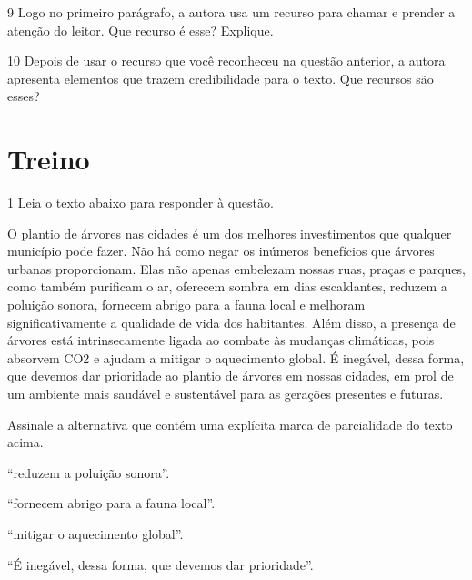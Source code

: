 \num{9} Logo no primeiro parágrafo, a autora usa um recurso para chamar e prender
a atenção do leitor. Que recurso é esse? Explique. 


\num{10} Depois de usar o recurso que você reconheceu na questão anterior, a 
autora apresenta elementos que trazem credibilidade para o texto. Que recursos
são esses? 


\section*{Treino}

\num{1} Leia o texto abaixo para responder à questão.

\begin{myquote}
O plantio de árvores nas cidades é um dos melhores investimentos que qualquer 
município pode fazer. Não há como negar os inúmeros benefícios que árvores urbanas 
proporcionam. Elas não apenas embelezam nossas ruas, praças e parques, como também purificam
o ar, oferecem sombra em dias escaldantes, reduzem a poluição sonora, fornecem
abrigo para a fauna local e melhoram significativamente a qualidade de vida
dos habitantes. Além disso, a presença de árvores está intrinsecamente ligada
ao combate às mudanças climáticas, pois absorvem CO2 e ajudam a mitigar o
aquecimento global. É inegável, dessa forma, que devemos dar prioridade ao plantio
de árvores em nossas cidades, em prol de um ambiente mais saudável e
sustentável para as gerações presentes e futuras.


\end{myquote}

Assinale a alternativa que contém uma explícita marca de parcialidade do texto acima.

\begin{escolha}

  \item ``reduzem a poluição sonora''.
  \item ``fornecem abrigo para a fauna local''.
  \item ``mitigar o aquecimento global''.
  \item ``É inegável, dessa forma, que devemos dar prioridade''. 

\end{escolha}

